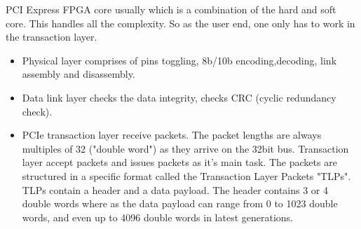 PCI Express FPGA core usually which is a combination of the hard and soft core. This handles all the complexity. So as the user end, one only has to work in the transaction layer.\\
\begin{itemize}
	\item Physical layer comprises of pins toggling, 8b/10b encoding,decoding, 
link assembly and disassembly.
    \item Data link layer checks the data integrity, checks CRC (cyclic redundancy check).
    \item PCIe transaction layer receive packets. The packet lengths are always multiples of 32 ("double word") as they arrive on the 32bit bus. Transaction layer accept packets and issues packets as it's main task. The packets are structured in a specific format called the Transaction Layer Packets "TLPs". TLPs contain a header and a data payload. The header contains 3 or 4 double words where as the data payload can range from 0 to 1023 double words, and even up to 4096 double words in latest generations.
\end{itemize}



